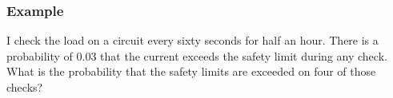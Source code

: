 \begin{frame}
  \frametitle{Example}

  I check the load on a circuit every sixty seconds for half an
  hour. There is a probability of 0.03 that the current exceeds the
  safety limit during any check. What is the probability that the
  safety limits are exceeded on four of those checks?

  \vfill

\end{frame}



